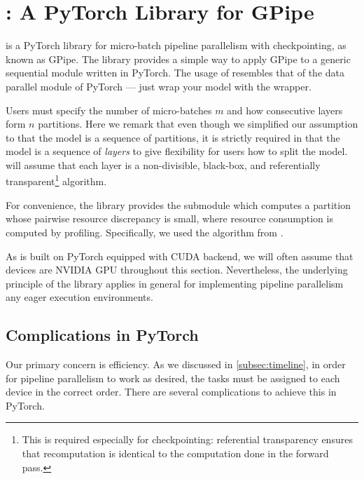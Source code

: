 
\section{{\torchgpipe}: A PyTorch Library for GPipe}
\label{sec:torchgpipe}

{\torchgpipe} is a PyTorch library for micro-batch pipeline parallelism with checkpointing, as known as GPipe. The library provides a simple way to apply GPipe to a generic sequential module written in PyTorch. The usage of {\torchgpipe} resembles that of the data parallel module of PyTorch --- just wrap your model with the wrapper.

Users must specify the number of micro-batches $m$ and how consecutive layers form $n$ partitions. Here we remark that even though we simplified our assumption to that the model is a sequence of partitions, it is strictly required in {\torchgpipe} that the model is a sequence of \emph{layers} to give flexibility for users how to split the model. {\torchgpipe} will assume that each layer is a non-divisible, black-box, and referentially transparent\footnote{This is required especially for checkpointing: referential transparency ensures that recomputation is identical to the computation done in the forward pass.} algorithm. 

For convenience, the library provides the submodule  which computes a partition whose pairwise resource discrepancy is small, where resource consumption is computed by profiling. Specifically, we used the algorithm from \cite{barany2015block}.

As {\torchgpipe} is built on PyTorch equipped with CUDA backend, we will often assume that devices are NVIDIA GPU throughout this section. Nevertheless, the underlying principle of the library applies in general for implementing pipeline parallelism any eager execution environments.


\subsection{Complications in PyTorch}
\label{subsec:obstacles}
Our primary concern is efficiency. As we discussed in \autoref{subsec:timeline}, in order for pipeline parallelism to work as desired, the tasks must be assigned to each device in the correct order. There are several complications to achieve this in PyTorch. 

